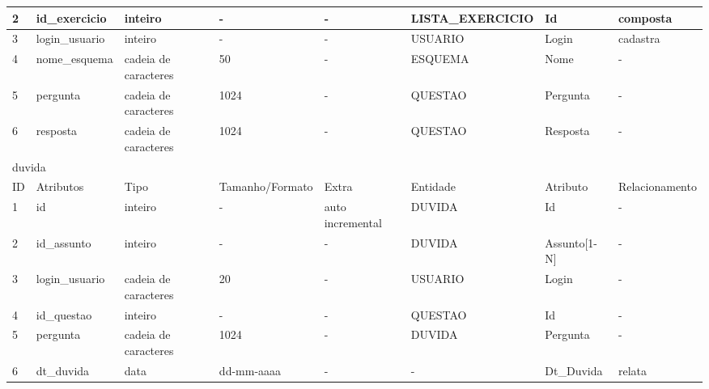 \documentclass[graduacao,brazil]{ThesisPUC}
\begin{document}
\begin{table}[H]
{\begin{tabular}{|l|l|l|l|l|l|l|l|}
    2                         & id\_exercicio    & inteiro              & -               & -                & LISTA\_EXERCICIO & Id               & composta        \\ \hline
    3                         & login\_usuario   & inteiro              & -               & -                & USUARIO         & Login            & cadastra        \\ \hline
    4                         & nome\_esquema    & cadeia de caracteres & 50              & -                & ESQUEMA         & Nome             & -               \\ \hline
    5                         & pergunta         & cadeia de caracteres & 1024            & -                & QUESTAO         & Pergunta         & -               \\ \hline
    6                         & resposta         & cadeia de caracteres & 1024            & -                & QUESTAO         & Resposta         & -               \\ \hline
    \multicolumn{8}{|l|}{duvida} \\ \hline
    ID                        & Atributos        & Tipo                 & Tamanho/Formato & Extra            & Entidade        & Atributo         & Relacionamento  \\ \hline
    1                         & id               & inteiro              & -               & auto incremental & DUVIDA          & Id               & -               \\ \hline
    2                         & id\_assunto      & inteiro              & -               & -                & DUVIDA          & Assunto[1-N]     & -               \\ \hline
    3                         & login\_usuario   & cadeia de caracteres & 20              & -                & USUARIO         & Login            & -               \\ \hline
    4                         & id\_questao      & inteiro              & -               & -                & QUESTAO         & Id               & -               \\ \hline
    5                         & pergunta         & cadeia de caracteres & 1024            & -                & DUVIDA          & Pergunta         & -               \\ \hline
    6                         & dt\_duvida       & data                 & dd-mm-aaaa      & -                & -               & Dt\_Duvida       & relata          \\ \hline

\end{tabular}}
\end{table}
\end{document}
